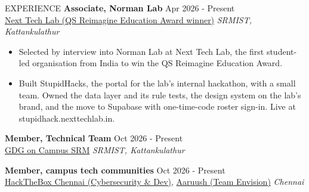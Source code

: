 \documentclass{resume} %
\begin{document}






\begin{rSection}{EXPERIENCE}
    \textbf{Associate, Norman Lab} \hfill Apr 2026 - Present\\
\href{https://nexttechlab.in}{Next Tech Lab (QS Reimagine Education Award winner)} \hfill \textit{SRMIST, Kattankulathur}
\begin{itemize}
\itemsep -3pt{}
\item Selected by interview into Norman Lab at Next Tech Lab, the first student-led organisation from India to win the QS Reimagine Education Award.
\item Built StupidHacks, the portal for the lab's internal hackathon, with a small team. Owned the data layer and its rule tests, the design system on the lab's brand, and the move to Supabase with one-time-code roster sign-in. Live at stupidhack.nexttechlab.in.
\end{itemize}

\textbf{Member, Technical Team} \hfill Oct 2026 - Present\\
\href{https://www.gdgsrm.com}{GDG on Campus SRM} \hfill \textit{SRMIST, Kattankulathur}

\textbf{Member, campus tech communities} \hfill Oct 2026 - Present\\
\href{https://htbchennai.in}{HackTheBox Chennai (Cybersecurity \& Dev)}, \href{https://aaruush.org}{Aaruush (Team Envision)} \hfill \textit{Chennai}
\end{rSection}


\end{document}
